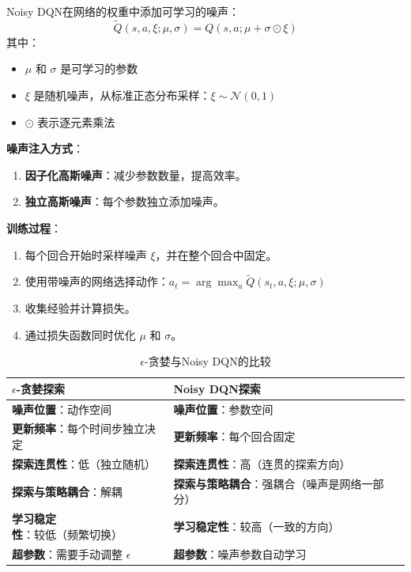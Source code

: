 \begin{definition}
Noisy DQN在网络的权重中添加可学习的噪声：
\[
\tilde{Q}(s, a, \xi; \mu, \sigma) = Q(s, a; \mu + \sigma \odot \xi)
\]
其中：
\begin{itemize}
    \item $\mu$ 和 $\sigma$ 是可学习的参数
    \item $\xi$ 是随机噪声，从标准正态分布采样：$\xi \sim \mathcal{N}(0, 1)$
    \item $\odot$ 表示逐元素乘法
\end{itemize}
\end{definition}

\textbf{噪声注入方式}：
\begin{enumerate}
    \item \textbf{因子化高斯噪声}：减少参数数量，提高效率。
    \item \textbf{独立高斯噪声}：每个参数独立添加噪声。
\end{enumerate}

\textbf{训练过程}：
\begin{enumerate}
    \item 每个回合开始时采样噪声 $\xi$，并在整个回合中固定。
    \item 使用带噪声的网络选择动作：$a_t = \arg\max_{a} \tilde{Q}(s_t, a, \xi; \mu, \sigma)$
    \item 收集经验并计算损失。
    \item 通过损失函数同时优化 $\mu$ 和 $\sigma$。
\end{enumerate}

\begin{table}[H]
\centering
\caption{$\epsilon$-贪婪与Noisy DQN的比较}
\begin{tabular}{p{}p{}}
\toprule
\textbf{$\epsilon$-贪婪探索} & \textbf{Noisy DQN探索} \\
\midrule
\textbf{噪声位置}：动作空间 & \textbf{噪声位置}：参数空间 \\
\hline
\textbf{更新频率}：每个时间步独立决定 & \textbf{更新频率}：每个回合固定 \\
\hline
\textbf{探索连贯性}：低（独立随机） & \textbf{探索连贯性}：高（连贯的探索方向） \\
\hline
\textbf{探索与策略耦合}：解耦 & \textbf{探索与策略耦合}：强耦合（噪声是网络一部分） \\
\hline
\textbf{学习稳定性}：较低（频繁切换） & \textbf{学习稳定性}：较高（一致的方向） \\
\hline
\textbf{超参数}：需要手动调整 $\epsilon$ & \textbf{超参数}：噪声参数自动学习 \\
\bottomrule
\end{tabular}
\end{table}

